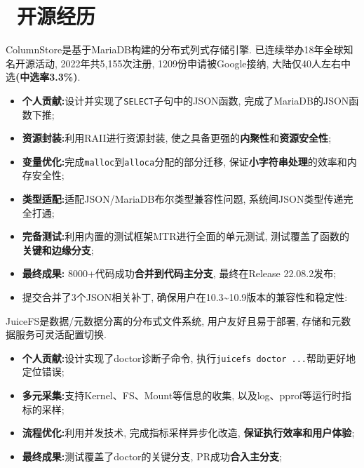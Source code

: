 \documentclass{resume}
\begin{document}
\section{\faUsers\ 开源经历}

ColumnStore是基于MariaDB构建的分布式列式存储引擎. 已连续举办18年全球知名开源活动, 2022年共5,155次注册, 1209份申请被Google接纳, 大陆仅40人左右中选\textbf{(中选率3.3\%)}.
\begin{itemize}[parsep=0.2ex]
  \item \textbf{个人贡献:}设计并实现了\verb|SELECT|子句中的JSON函数, 完成了MariaDB的JSON函数下推;
  \item \textbf{资源封装:}利用RAII进行资源封装, 使之具备更强的\textbf{内聚性}和\textbf{资源安全性};
  \item \textbf{变量优化:}完成\verb|malloc|到\verb|alloca|分配的部分迁移, 保证\textbf{小字符串处理}的效率和内存安全性;
  \item \textbf{类型适配:}适配JSON/MariaDB布尔类型兼容性问题, 系统间JSON类型传递完全打通;
  \item \textbf{完备测试:}利用内置的测试框架MTR进行全面的单元测试, 测试覆盖了函数的\textbf{关键和边缘分支};
  \item \textbf{最终成果:} 8000+代码成功\textbf{合并到代码主分支}, 最终在Release 22.08.2发布;\enspace{}
  \item 提交合并了3个JSON相关补丁, 确保用户在10.3\textasciitilde 10.9版本的兼容性和稳定性:\enspace{}
\end{itemize}

JuiceFS是数据/元数据分离的分布式文件系统, 用户友好且易于部署, 存储和元数据服务可灵活配置切换.
\begin{itemize}[parsep=0.2ex]
  \item \textbf{个人贡献:}设计实现了doctor诊断子命令, 执行\verb|juicefs doctor ...|帮助更好地定位错误;
  \item \textbf{多元采集:}支持Kernel、FS、Mount等信息的收集, 以及log、pprof等运行时指标的采样;
  \item \textbf{流程优化:}利用并发技术, 完成指标采样异步化改造, \textbf{保证执行效率和用户体验};
  \item \textbf{最终成果:}测试覆盖了doctor的关键分支, PR成功\textbf{合入主分支};\enspace{}
\end{itemize}
\end{document}
